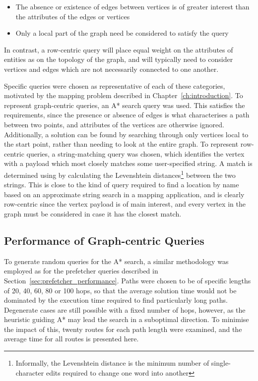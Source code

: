 \begin{itemize}
	\item The absence or existence of edges between vertices is of greater interest than the attributes of the edges or vertices
	\item Only a local part of the graph need be considered to satisfy the query
\end{itemize}

In contrast, a row-centric query will place equal weight on the
attributes of entities as on the topology of the graph, and will typically
need to consider vertices and edges which are not necessarily connected to one
another. 

Specific queries were chosen as representative of each of these categories,
motivated by the mapping problem described in Chapter~\ref{ch:introduction}.
To represent graph-centric queries, an A* search query was used. This
satisfies the requirements, since the presence or absence of edges is what
characterises a path between two points, and attributes of the vertices are
otherwise ignored. Additionally, a solution can be found by searching through
only vertices local to the start point, rather than needing to look at the entire
graph. To represent row-centric queries, a string-matching query was chosen,
which identifies the vertex with a payload which most closely matches some user-specified string. A match is determined using by calculating the Levenshtein
distances\footnote{Informally, the Levenshtein distance is the minimum number
of single-character edits required to change one word into another} between
the two strings.  This is close to the kind of  query required to find a
location by name based on an approximate string search in a mapping application, and
is clearly row-centric since the vertex payload is of main interest, and
every vertex in the graph must be considered in case it has the closest match.


\subsection{Performance of Graph-centric Queries} %
\label{sub:performance_of_graph_centric_queries}

To generate random queries for the A* search, a similar methodology was
employed as for the prefetcher queries described in
Section~\ref{sec:prefetcher_performance}.  Paths were chosen to be of specific
lengths of 20, 40, 60, 80 or 100 hops, so that the average solution time would not
be dominated by the execution time required to find particularly long paths.
Degenerate cases are still possible with a fixed number of hops, however,
as the heuristic guiding A* may lead the search in a suboptimal direction. To 
minimise the impact of this, twenty routes for each path length were examined,
and the average time for all routes is presented here.

